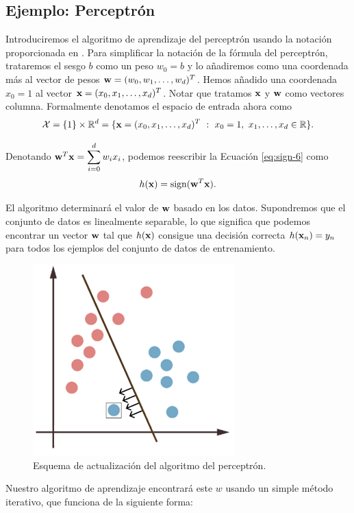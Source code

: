 \documentclass[oneside,openright,titlepage,numbers=noenddot,openany,headinclude,footinclude=true,
cleardoublepage=empty,abstractoff,BCOR=5mm,paper=a4,fontsize=12pt,main=spanish]{scrreprt}
\begin{document}
\subsection{Ejemplo: Perceptrón} \label{subsec:perceptron}

Introduciremos el algoritmo de aprendizaje del perceptrón usando la notación proporcionada en \cite{learning2012}. Para simplificar la notación de la fórmula del perceptrón, trataremos el sesgo $b$ como un peso $w_0=b$ y lo añadiremos como una coordenada más al vector de pesos $\textbf{w}=(w_0,w_1,\dots,w_d)^T$. Hemos añadido una coordenada $x_0=1$ al vector $\textbf{x}=(x_0,x_1,\dots,x_d)^T$. Notar que tratamos $\textbf{x}$ y $\textbf{w}$ como vectores columna. Formalmente denotamos el espacio de entrada ahora como $$\mathcal{X}=\{1\}\times \mathbb{R}^d=\{\textbf{x}=(x_0,x_1,\dots,x_d)^T \ : \ x_0=1, \ x_1,\dots,x_d \in \mathbb{R}\}.$$

Denotando $\textbf{w}^T\textbf{x}=\displaystyle \sum_{i=0}^d w_ix_i$, podemos reescribir la Ecuación \ref{eq:sign-6} como $$h(\textbf{x})=\text{sign}(\textbf{w}^T\textbf{x}).$$

El algoritmo determinará el valor de $\textbf{w}$ basado en los datos. Supondremos que el conjunto de datos es linealmente separable, lo que significa que podemos encontrar un vector $\textbf{w}$ tal que $h(\textbf{x})$ consigue una decisión correcta $h(\textbf{x}_n)=y_n$ para todos los ejemplos del conjunto de datos de entrenamiento.\\

\begin{figure}[h]
	\centering
	\includegraphics[width=7.8cm]{movclassified.png}
	\caption{Esquema de actualización del algoritmo del perceptrón.}
    \label{fig:movsep}
\end{figure}

Nuestro algoritmo de aprendizaje encontrará este $w$ usando un simple método iterativo, que funciona de la siguiente forma:
\end{document}
